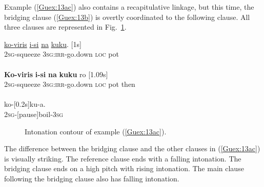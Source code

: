 \documentclass[output=paper]{LSP/langsci}
\begin{document}
Example (\ref{Guex:13ac}) also contains a recapitulative linkage, but this time, the bridging clause (\ref{Guex:13b}) is overtly coordinated to the following clause. All three clauses are represented in Fig.~\ref{GuF3}. 

\begin{exe}
\ex \label{Guex:13ac}
\begin{xlist}
\ex \label{Guex:13a}
\gll \underline{ko-viris}          \underline{i-si}                 \underline{na}     \underline{kuku}. [1s]\\
\textsc{2sg}-squeeze     \textsc{3sg:irr-}go.down   \textsc{loc}    pot \\
\glt {}\\
\ex \label{Guex:13b}
\gll \textbf{Ko-viris}          \textbf{i-si}               \textbf{na}    \textbf{kuku}   ro [1.09s] \\
\textsc{2sg}-squeeze     \textsc{3sg:irr-}go.down   \textsc{loc}    pot then\\
\glt {}\\
\ex \label{Guex:13c}
\gll   ko-[0.2s]ku-a.\\     	       
\textsc{2sg}-[pause]boil-\textsc{3sg}\\
\glt {} 
\end{xlist}
\end{exe}

\begin{figure}[ht]
\caption{Intonation contour of example (\ref{Guex:13ac}). \label{GuF3}}
\end{figure}

The difference between the bridging clause and the other clauses in (\ref{Guex:13ac}) is visually striking. The reference clause ends with a falling intonation. The bridging clause ends on a high pitch with rising intonation. The main clause following the bridging clause also has falling intonation. 
\end{document}
